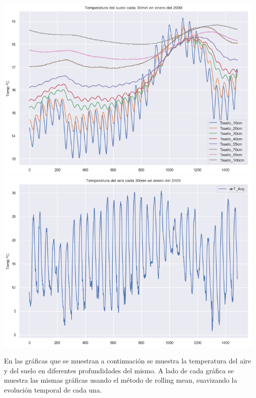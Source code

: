 \documentclass{article}
\begin{document}
\begin{center}
    \includegraphics[scale = 0.3]{TG09.png}
    \includegraphics[scale = 0.3]{TA09.png}
\end{center}

En las gráficas que se muestran a continuación se muestra la temperatura del aire y del suelo en diferentes profundidades del mismo. A lado de cada gráfica se muestra las mismas gráficas usando el método de rolling mean, suavizando la evolución temporal de cada una.
\end{document}
